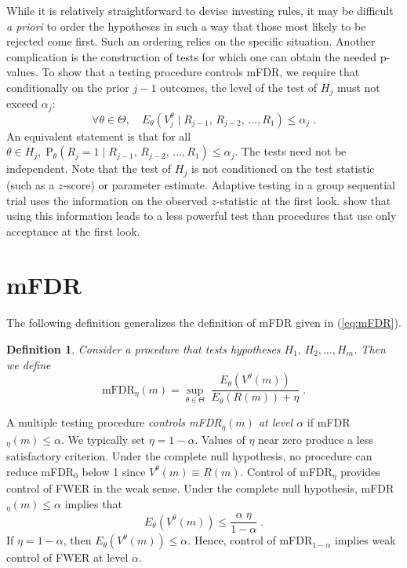 \documentclass[12pt]{article}
\newcommand{\pr}{\mbox{P}}
\newcommand{\eqn}[1]{(\ref{#1})}
\newcommand{\given}{\; \big| \;}
\newtheorem{definition}{Definition}
\begin{document}
While it is relatively straightforward to devise investing rules, it
 may be difficult {\it a priori} to order the hypotheses in such a way
 that those most likely to be rejected come first.  Such an ordering
 relies on the specific situation.  Another complication is
 the construction of tests for which one can obtain the needed p-values. 
  To show that a testing procedure controls mFDR, we require  that conditionally on the prior $j-1$ outcomes, the level of the test of $H_j$ must not exceed $\alpha_j$:
\begin{equation}
  \forall \theta \in \Theta, \quad
  E_\theta(V^\theta_j \given R_{j-1},\,R_{j-2},\, \ldots, R_1)
  \le \alpha_j   \;.
\label{eq:alpham}
\end{equation}
An equivalent statement is that for all $\theta \in H_j,\;
\pr_\theta(R_j = 1 \given R_{j-1},\,R_{j-2},\, \ldots, R_1) \le \alpha_j$.
The tests need not be independent.
Note that the test of $H_j$ is not
conditioned on the test statistic (such as a $z$-score) or parameter
estimate.  Adaptive testing in a group sequential trial
\citep[e.g.][]{lehmacher99} uses the information on the observed
$z$-statistic at the first look.  \cite{tsiatis03} show that using
this information leads to a less powerful test than procedures that 
use only acceptance at the first look.



\section{mFDR}   \label{sec:mFDR}                          %

The following definition 
generalizes the definition of mFDR given in  \eqn{eq:mFDR}.  
\begin{definition} Consider a procedure that tests
 hypotheses $H_{1},\, H_{2},\ldots, H_m$.  Then we define
\begin{equation}
  \mbox{mFDR}_{\eta}(m) 
   = \sup_{\theta \in \Theta} \;
\frac{E_\theta\left(V^\theta(m) \right)}{E_\theta \left(R(m)\right) + \eta}  \;.
\label{eq:def:mFDR}
\end{equation}
\end{definition}
A multiple testing procedure {\em controls mFDR${}_{\eta}(m)$ at level $\alpha$} if
 mFDR$_{\eta}(m) \le \alpha$.
We typically set $\eta =1-\alpha$.  Values of $\eta$ near zero produce a less 
satisfactory criterion. Under the complete null hypothesis,
no procedure can reduce mFDR${}_{0}$ below 1 since $V^{\theta}(m) \equiv R(m)$.  
Control of mFDR${}_\eta$ provides control of FWER in the weak sense. 
Under the complete null hypothesis, mFDR${}_\eta(m) \le \alpha$ implies that  
\begin{displaymath}
   E_\theta(V^\theta(m)) \le \frac{\alpha\;\eta}{1 - \alpha} \;.
\end{displaymath}
If $\eta = 1-\alpha$, then $E_\theta(V^\theta(m)) \le \alpha$.  
Hence, control of mFDR$_{1-\alpha}$ implies weak control of FWER at level $\alpha$.
\end{document}
